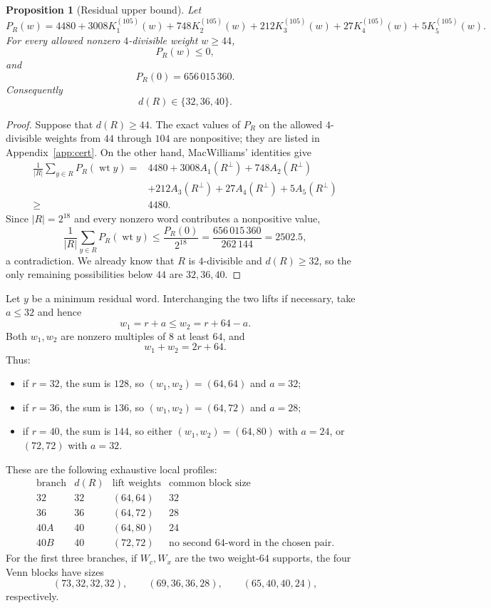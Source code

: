 \documentclass[11pt,reqno]{amsart}
\newtheorem{proposition}[theorem]{Proposition}
\theoremstyle{remark}
\newcommand{\wt}{\operatorname{wt}}
\begin{document}
\begin{proposition}[Residual upper bound]\label{prop:res64upper}
Let
\[
P_R(w)=4480+3008K_1^{(105)}(w)+748K_2^{(105)}(w)+212K_3^{(105)}(w)
+27K_4^{(105)}(w)+5K_5^{(105)}(w).
\]
For every allowed nonzero $4$-divisible weight $w\ge44$,
\[
P_R(w)\le0,
\]
and
\[
P_R(0)=656\,015\,360.
\]
Consequently
\[
d(R)\in\{32,36,40\}.
\]
\end{proposition}

\begin{proof}
Suppose that $d(R)\ge44$.  The exact values of $P_R$ on the allowed $4$-divisible weights from $44$ through $104$ are nonpositive; they are listed in Appendix~\ref{app:cert}.  On the other hand, MacWilliams' identities give
\[
\begin{aligned}
\frac1{|R|}\sum_{y\in R}P_R(\wt y)
={}&4480+3008A_1(R^\perp)+748A_2(R^\perp)\\
&+212A_3(R^\perp)+27A_4(R^\perp)+5A_5(R^\perp)\\
\ge{}&4480.
\end{aligned}
\]
Since $|R|=2^{18}$ and every nonzero word contributes a nonpositive value,
\[
\frac1{|R|}\sum_{y\in R}P_R(\wt y)
\le \frac{P_R(0)}{2^{18}}
=\frac{656\,015\,360}{262\,144}
=2502.5,
\]
a contradiction.  We already know that $R$ is $4$-divisible and $d(R)\ge32$, so the only remaining possibilities below $44$ are $32,36,40$.
\end{proof}

Let $y$ be a minimum residual word.  Interchanging the two lifts if necessary, take $a\le32$ and hence
\[
w_1=r+a\le w_2=r+64-a.
\]
Both $w_1,w_2$ are nonzero multiples of $8$ at least $64$, and
\[
w_1+w_2=2r+64.
\]
Thus:
\begin{itemize}[leftmargin=*]
\item if $r=32$, the sum is $128$, so $(w_1,w_2)=(64,64)$ and $a=32$;
\item if $r=36$, the sum is $136$, so $(w_1,w_2)=(64,72)$ and $a=28$;
\item if $r=40$, the sum is $144$, so either $(w_1,w_2)=(64,80)$ with $a=24$, or $(72,72)$ with $a=32$.
\end{itemize}
These are the following exhaustive local profiles:
\[
\begin{array}{c|c|c|c}
\text{branch}&d(R)&\text{lift weights}&\text{common block size}\\\hline
32&32&(64,64)&32\\
36&36&(64,72)&28\\
40A&40&(64,80)&24\\
40B&40&(72,72)&\text{no second }64\text{-word in the chosen pair}.
\end{array}
\]
For the first three branches, if $W_c,W_x$ are the two weight-$64$ supports, the four Venn blocks have sizes
\[
(73,32,32,32),\qquad
(69,36,36,28),\qquad
(65,40,40,24),
\]
respectively.
\end{document}
